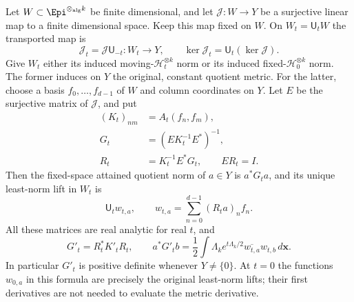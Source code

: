 \begin{theorem}
\label{wt:thm:metric}
Let $W\subset\Epi^{\otimes_{\mathrm{alg}} k}$ be finite
dimensional, and let $\mathcal J:W\to Y$ be a surjective linear
map to a finite dimensional space.  Keep this map fixed on $W$.
On $W_t=\mathsf U_tW$ the transported map is
\[
 \mathcal J_t=\mathcal J\mathsf U_{-t}:W_t\longrightarrow Y,
 \qquad \ker\mathcal J_t=\mathsf U_t(\ker\mathcal J).
\]
Give $W_t$ either its induced moving-$\mathcal H_t^{\otimes k}$ norm or
its induced fixed-$\mathcal H_0^{\otimes k}$ norm.  The former induces
on $Y$ the original, constant quotient metric.  For the latter,
choose a basis $f_0,\ldots,f_{d-1}$ of $W$ and column coordinates
on $Y$.  Let $E$ be the surjective matrix of $\mathcal J$, and put
\begin{equation}\label{wt:eq:matrix-formula}
 \begin{split}
 (K_t)_{nm}&=A_t(f_n,f_m),\\
 G_t&=(E K_t^{-1}E^*)^{-1},\\
 R_t&=K_t^{-1}E^*G_t,\qquad ER_t=I.
 \end{split}
\end{equation}
Then the fixed-space attained quotient norm of $a\in Y$ is
$a^*G_ta$, and its unique least-norm lift in $W_t$ is
\begin{equation}\label{wt:eq:lift}
 \mathsf U_tw_{t,a},\qquad
 w_{t,a}=\sum_{n=0}^{d-1}(R_ta)_nf_n.
\end{equation}
All these matrices are real analytic for real $t$, and
\begin{equation}\label{wt:eq:derivative}
 G'_t=R_t^*K'_tR_t,\qquad
 a^*G'_tb
 =\frac12\int\Lambda_ke^{t\Lambda_k/2}
       \overline{w_{t,a}}w_{t,b}\,d\mathbf x.
\end{equation}
In particular $G'_t$ is positive definite whenever $Y\ne\{0\}$.
At $t=0$ the functions $w_{0,a}$ in this formula are precisely
the original least-norm lifts; their first derivatives are not
needed to evaluate the metric derivative.
\end{theorem}

